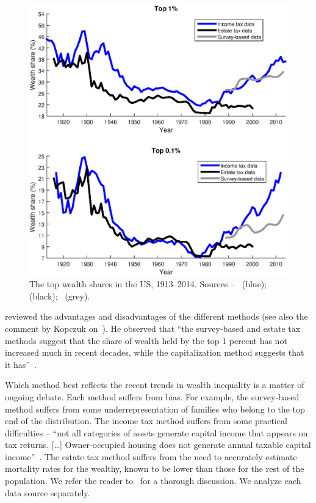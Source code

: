 \begin{figure}[!htb]
\centering
\includegraphics[width=1.0\textwidth] {./chapter_3/figs/data.eps}
\caption{The top wealth shares in the US, 1913--2014. Sources --~\cite{SaezZucman2014,WID2017} (blue);~\cite{kopczuk2004top} (black);~\cite{bricker2016measuring2} (grey).}
\end{figure}

\cite{kopczuk2015we} reviewed the advantages and disadvantages of the different methods (see also the comment by Kopczuk on~\cite{bricker2016measuring2}). He observed that ``the survey-based and estate tax methods suggest that the share of wealth held by the top 1 percent has not increased much in recent decades, while the capitalization method suggests that it has''~\cite[p.~48] {kopczuk2015we}.

Which method best reflects the recent trends in wealth inequality is a matter of ongoing debate. Each method suffers from bias. For example, the survey-based method suffers from some underrepresentation of families who belong to the top end of the distribution. The income tax method suffers from some practical difficulties -- ``not all categories of assets generate capital income that appears on tax returns. [\ldots] Owner-occupied housing does not generate annual taxable capital income''~\cite[p. 54] {kopczuk2015we}. The estate tax method suffers from the need to accurately estimate mortality rates for the wealthy, known to be lower than those for the rest of the population. We refer the reader to~\cite{kopczuk2015we,bricker2016measuring2} for a thorough discussion. We analyze each data source separately.

